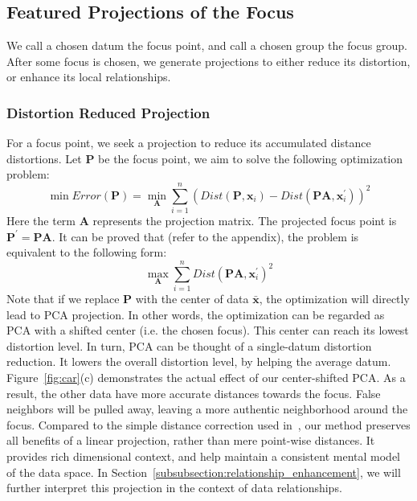 \subsection{Featured Projections of the Focus}
We call a chosen datum the focus point, and call a chosen group the focus group. After some focus is chosen, we generate projections to either reduce its distortion, or enhance its local relationships.

\subsubsection{Distortion Reduced Projection}
For a focus point, we seek a projection to reduce its accumulated distance distortions. Let $\mathbf{P}$ be the focus point, we aim to solve the following optimization problem:
\begin{equation}
\min Error(\mathbf{P}) = \min_{\mathbf{A}}  \sum\limits_{i=1}^{n}(Dist(\mathbf{P}, \mathbf{x}_{i}) - Dist(\mathbf{PA}, \mathbf{x}_{i}^{\prime}))^{2}
\end{equation}
Here the term $\mathbf{A}$ represents the projection matrix. The projected focus point is $\mathbf{P^{\prime}} = \mathbf{PA}$. It can be proved that (refer to the appendix), the problem is equivalent to the following form:
\begin{equation}
\label{equation:center-shiftedPCA}
\max_{\mathbf{A}}  \sum\limits_{i=1}^{n}Dist(\mathbf{PA}, \mathbf{x}_{i}^{\prime})^{2}
\end{equation}
Note that if we replace $\mathbf{P}$ with the center of data $\mathbf{\bar{x}}$, the optimization will directly lead to PCA projection. In other words, the optimization can be regarded as PCA with a shifted center (i.e. the chosen focus). This center can reach its lowest distortion level. In turn, PCA can be thought of a single-datum distortion reduction. It lowers the overall distortion level, by helping the average datum. Figure~\ref{fig:car}(c) demonstrates the actual effect of our center-shifted PCA. As a result, the other data have more accurate distances towards the focus. False neighbors will be pulled away, leaving a more authentic neighborhood around the focus. Compared to the simple distance correction used in~\cite{DBLP:journals/tvcg/StahnkeDMT16}, our method preserves all benefits of a linear projection, rather than mere point-wise distances. It provides rich dimensional context, and help maintain a consistent mental model of the data space. In Section~\ref{subsubsection:relationship_enhancement}, we will further interpret this projection in the context of data relationships.

